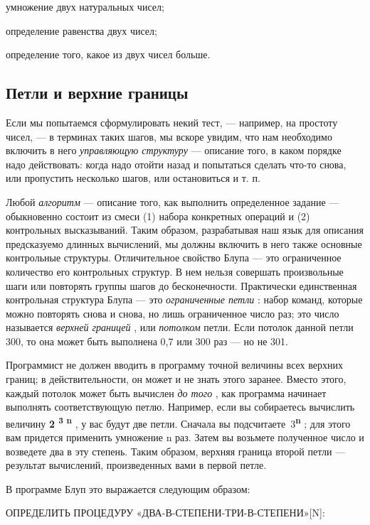 \documentclass[../main.tex]{subfiles}
\begin{document}
умножение двух натуральных чисел;

определение равенства двух чисел;

определение того, какое из двух чисел больше.


\subsection{Петли и верхние границы}

Если мы попытаемся сформулировать некий тест, --- например, на простоту чисел, --- в терминах таких шагов, мы вскоре увидим, что нам необходимо включить в него \emph{управляющую структуру} --- описание того, в каком порядке надо действовать: когда надо отойти назад и попытаться сделать что-то снова, или пропустить несколько шагов, или остановиться и т. п.

Любой \emph{алгоритм} --- описание того, как выполнить определенное задание --- обыкновенно состоит из смеси (1) набора конкретных операций и (2) контрольных высказываний. Таким образом, разрабатывая наш язык для описания предсказуемо длинных вычислений, мы должны включить в него также основные контрольные структуры. Отличительное свойство Блупа --- это ограниченное количество его контрольных структур. В нем нельзя совершать произвольные шаги или повторять группы шагов до бесконечности. Практически единственная контрольная структура Блупа --- это \emph{ограниченные петли} : набор команд, которые можно повторять снова и снова, но лишь ограниченное число раз; это число называется \emph{верхней границей} , или \emph{потолком} петли. Если потолок данной петли 300, то она может быть выполнена 0,7 или 300 раз --- но не 301.

Программист не должен вводить в программу точной величины всех верхних границ; в действительности, он может и не знать этого заранее. Вместо этого, каждый потолок может быть вычислен \emph{до того} , как программа начинает выполнять соответствующую петлю. Например, если вы собираетесь вычислить величину \textbf{2 \textsuperscript{3 n}} , у вас будут две петли. Сначала вы подсчитаете~3\textbf{\textsuperscript{n}} ; для этого вам придется применить умножение n раз. Затем вы возьмете полученное число и возведете два в эту степень. Таким образом, верхняя граница второй петли --- результат вычислений, произведенных вами в первой петле.

В программе Блуп это выражается следующим образом:

ОПРЕДЕЛИТЬ ПРОЦЕДУРУ «ДВА-В-СТЕПЕНИ-ТРИ-В-СТЕПЕНИ»{[}N{]}:
\end{document}
